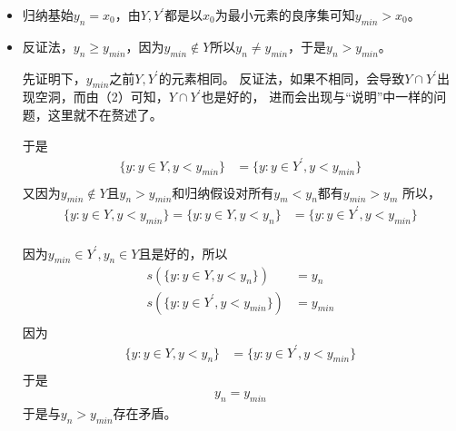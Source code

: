 \documentclass{article}
\begin{document}
\begin{itemize}
  \item 归纳基始$y_n = x_0$，由$Y,Y^\prime$都是以$x_0$为最小元素的良序集可知$y_{min} > x_0$。
  \item  反证法，$y_n \geq y_{min}$，因为$y_{min} \not \in Y$所以$y_n \neq y_{min}$，于是$y_n > y_{min}$。

        先证明下，$y_{min}$之前$Y, Y^\prime$的元素相同。
        反证法，如果不相同，会导致$Y \cap Y^\prime$出现空洞，而由（2）可知，$Y \cap Y^\prime$也是好的，
        进而会出现与“说明”中一样的问题，这里就不在赘述了。

        于是
        \begin{align*}
          \{ y : y \in Y, y < y_{min}\} & = \{ y : y \in Y^\prime, y < y_{min} \} \\
        \end{align*}
        又因为$y_{min} \not \in Y$且$y_n > y_{min}$和归纳假设对所有$y_m < y_n$都有$y_{min} > y_m $
        所以，
        \begin{align*}
          \{ y : y \in Y, y < y_{min}\} = \{ y : y \in Y, y < y_{n}\} & = \{ y : y \in Y^\prime, y < y_{min} \} \\
        \end{align*}

        因为$y_{min} \in Y^\prime, y_n \in Y$且是好的，所以
        \begin{align*}
          s(\{ y : y \in Y, y < y_n\})            & = y_n     \\
          s(\{ y : y \in Y^\prime, y < y_{min}\}) & = y_{min} \\
        \end{align*}
        因为
        \begin{align*}
          \{ y : y \in Y, y < y_{n}\} & = \{ y : y \in Y^\prime, y < y_{min} \} \\
        \end{align*}
        于是
        \begin{align*}
          y_n = y_{min}
        \end{align*}
        于是与$y_n > y_{min}$存在矛盾。
\end{itemize}
\end{document}
